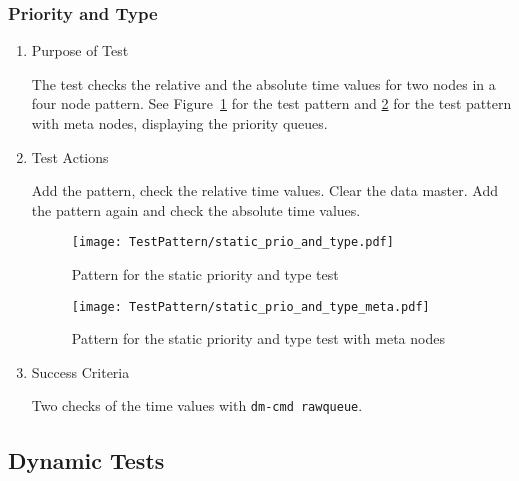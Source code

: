 \subsubsection{Priority and Type}
\begin{enumerate}
	\item Purpose of Test

The test checks the relative and the absolute time values for two nodes in a four node pattern.
See Figure~\ref{fig:Pattern_for_the_static_priority_and_type_test} for the test pattern
and \ref{fig:Pattern_for_the_static_priority_and_type_test_with_meta_nodes} for the test pattern with meta nodes,
displaying the priority queues.
	\item Test Actions

	Add the pattern, check the relative time values. Clear the data master. Add the pattern again and check the absolute time values.
    \begin{figure}
        \centering
        \texttt{[image: TestPattern/static\_prio\_and\_type.pdf]}
        \caption{Pattern for the static priority and type test}
        \label{fig:Pattern_for_the_static_priority_and_type_test}
    \end{figure}
    \begin{figure}
        \centering
        \texttt{[image: TestPattern/static\_prio\_and\_type\_meta.pdf]}
        \caption{Pattern for the static priority and type test with meta nodes}
        \label{fig:Pattern_for_the_static_priority_and_type_test_with_meta_nodes}
    \end{figure}
	\item Success Criteria

	Two checks of the time values with \texttt{dm-cmd rawqueue}.
\end{enumerate}
\subsection{Dynamic Tests}
